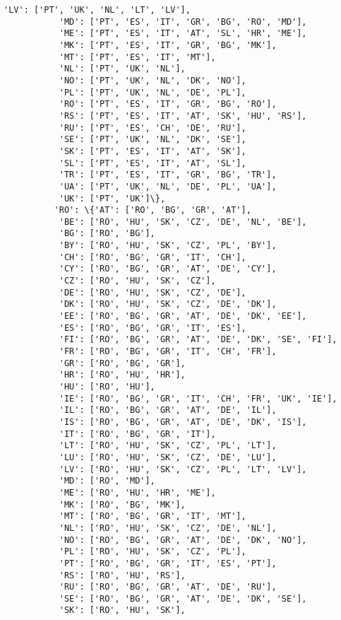 \documentclass[11pt]{article}
\begin{document}
\begin{Verbatim}[commandchars=\\\{\}]
           'LV': ['PT', 'UK', 'NL', 'LT', 'LV'],
           'MD': ['PT', 'ES', 'IT', 'GR', 'BG', 'RO', 'MD'],
           'ME': ['PT', 'ES', 'IT', 'AT', 'SL', 'HR', 'ME'],
           'MK': ['PT', 'ES', 'IT', 'GR', 'BG', 'MK'],
           'MT': ['PT', 'ES', 'IT', 'MT'],
           'NL': ['PT', 'UK', 'NL'],
           'NO': ['PT', 'UK', 'NL', 'DK', 'NO'],
           'PL': ['PT', 'UK', 'NL', 'DE', 'PL'],
           'RO': ['PT', 'ES', 'IT', 'GR', 'BG', 'RO'],
           'RS': ['PT', 'ES', 'IT', 'AT', 'SK', 'HU', 'RS'],
           'RU': ['PT', 'ES', 'CH', 'DE', 'RU'],
           'SE': ['PT', 'UK', 'NL', 'DK', 'SE'],
           'SK': ['PT', 'ES', 'IT', 'AT', 'SK'],
           'SL': ['PT', 'ES', 'IT', 'AT', 'SL'],
           'TR': ['PT', 'ES', 'IT', 'GR', 'BG', 'TR'],
           'UA': ['PT', 'UK', 'NL', 'DE', 'PL', 'UA'],
           'UK': ['PT', 'UK']\},
          'RO': \{'AT': ['RO', 'BG', 'GR', 'AT'],
           'BE': ['RO', 'HU', 'SK', 'CZ', 'DE', 'NL', 'BE'],
           'BG': ['RO', 'BG'],
           'BY': ['RO', 'HU', 'SK', 'CZ', 'PL', 'BY'],
           'CH': ['RO', 'BG', 'GR', 'IT', 'CH'],
           'CY': ['RO', 'BG', 'GR', 'AT', 'DE', 'CY'],
           'CZ': ['RO', 'HU', 'SK', 'CZ'],
           'DE': ['RO', 'HU', 'SK', 'CZ', 'DE'],
           'DK': ['RO', 'HU', 'SK', 'CZ', 'DE', 'DK'],
           'EE': ['RO', 'BG', 'GR', 'AT', 'DE', 'DK', 'EE'],
           'ES': ['RO', 'BG', 'GR', 'IT', 'ES'],
           'FI': ['RO', 'BG', 'GR', 'AT', 'DE', 'DK', 'SE', 'FI'],
           'FR': ['RO', 'BG', 'GR', 'IT', 'CH', 'FR'],
           'GR': ['RO', 'BG', 'GR'],
           'HR': ['RO', 'HU', 'HR'],
           'HU': ['RO', 'HU'],
           'IE': ['RO', 'BG', 'GR', 'IT', 'CH', 'FR', 'UK', 'IE'],
           'IL': ['RO', 'BG', 'GR', 'AT', 'DE', 'IL'],
           'IS': ['RO', 'BG', 'GR', 'AT', 'DE', 'DK', 'IS'],
           'IT': ['RO', 'BG', 'GR', 'IT'],
           'LT': ['RO', 'HU', 'SK', 'CZ', 'PL', 'LT'],
           'LU': ['RO', 'HU', 'SK', 'CZ', 'DE', 'LU'],
           'LV': ['RO', 'HU', 'SK', 'CZ', 'PL', 'LT', 'LV'],
           'MD': ['RO', 'MD'],
           'ME': ['RO', 'HU', 'HR', 'ME'],
           'MK': ['RO', 'BG', 'MK'],
           'MT': ['RO', 'BG', 'GR', 'IT', 'MT'],
           'NL': ['RO', 'HU', 'SK', 'CZ', 'DE', 'NL'],
           'NO': ['RO', 'BG', 'GR', 'AT', 'DE', 'DK', 'NO'],
           'PL': ['RO', 'HU', 'SK', 'CZ', 'PL'],
           'PT': ['RO', 'BG', 'GR', 'IT', 'ES', 'PT'],
           'RS': ['RO', 'HU', 'RS'],
           'RU': ['RO', 'BG', 'GR', 'AT', 'DE', 'RU'],
           'SE': ['RO', 'BG', 'GR', 'AT', 'DE', 'DK', 'SE'],
           'SK': ['RO', 'HU', 'SK'],

\end{Verbatim}
\end{document}
